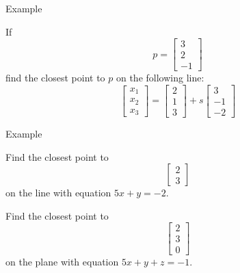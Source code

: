 \documentclass{beamer}
\begin{document}
\begin{frame}{Example}
    \begin{example}
    If
    \begin{equation*}
      p= \left[
	\begin{array}{c}
          3\\
          2\\
          -1
	\end{array}
      \right]
    \end{equation*}
    find the closest point to $p$ on the following line:
    \begin{equation*}
      \left[
	\begin{array}{c}
          x_1\\
          x_2\\
          x_3
	\end{array}
      \right] = \left[
	\begin{array}{c}
          2\\
          1\\
          3
	\end{array}
      \right]+s \left[
	\begin{array}{c}
          3\\
          -1\\
          -2
	\end{array}
      \right]
    \end{equation*}
  \end{example}
\end{frame}

\begin{frame}{Example}
    \begin{example}
        Find the closest point to
        \begin{equation*}
          \left[
        \begin{array}{c}
              2\\
              3
        \end{array}
          \right]
        \end{equation*}
        on the line with equation $5x+y = -2$.
      \end{example}
    \begin{example}
    Find the closest point to
    \begin{equation*}
      \left[
	\begin{array}{c}
          2\\
          3\\
          0
	\end{array}
      \right]
    \end{equation*}
    on the plane with equation $5x+y+z = -1$.
  \end{example}
\end{frame}
\end{document}
